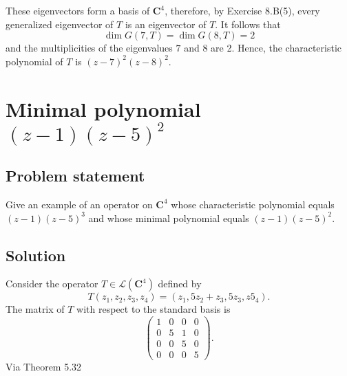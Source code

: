 \documentclass{article}
\begin{document}
These eigenvectors form a basis of $\mathbf{C}^4$, therefore, by Exercise 8.B(5), every generalized eigenvector of $T$ is an eigenvector of $T$. 
It follows that
\[\operatorname{dim}G(7,T)=\operatorname{dim}G (8, T) = 2\]
and the multiplicities of the eigenvalues $7$ and $8$ are 2. Hence, the characteristic polynomial of $T$ is $(z-7)^2(z-8)^2$.

\clearpage

\section{Minimal polynomial $(z-1)(z-5)^2$}
\subsection*{Problem statement}
Give an example of an operator on $\mathbf{C}^4$ whose characteristic polynomial equals $(z-1)(z-5)^3$ and whose minimal polynomial equals $(z-1)(z-5)^2$.

\subsection*{Solution}
Consider the operator $T\in\mathcal{L}(\mathbf{C}^4)$ defined by
\begin{equation*}
T(z_1,z_2,z_3,z_4)=(z_1,5z_2+z_3,5z_3,z5_4).
\end{equation*}
The matrix of $T$ with respect to the standard basis is
\begin{equation*}
\begin{pmatrix}
1 & 0 & 0 & 0\\
0 & 5 & 1 & 0\\
0 & 0 & 5 & 0\\
0 & 0 & 0 & 5
\end{pmatrix}.
\end{equation*}
Via Theorem 5.32
\end{document}
